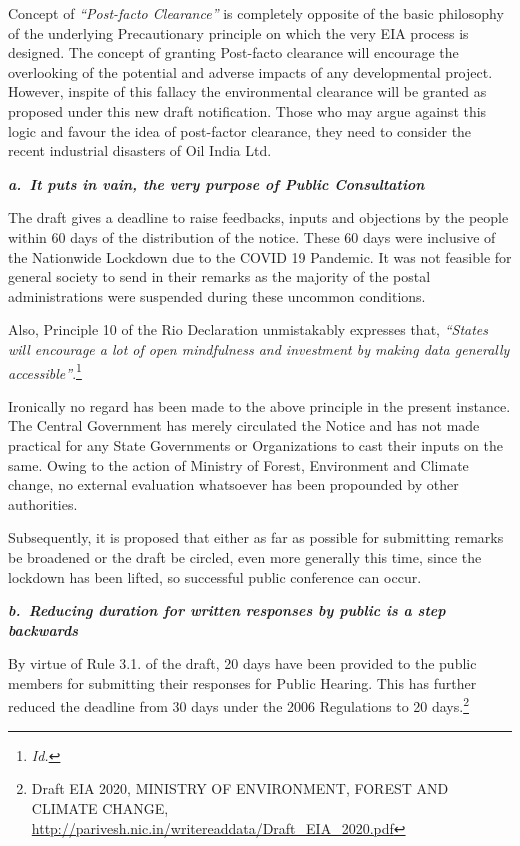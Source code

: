 \begin{multicols}{2}
\noi
Concept of \textit{“Post-facto Clearance”} is completely opposite of the basic philosophy of the
underlying Precautionary principle on which the very EIA process is designed. The concept
of granting Post-facto clearance will encourage the overlooking of the potential and adverse impacts of any developmental project. However, inspite of this fallacy the environmental
clearance will be granted as proposed under this new draft notification. Those who may argue
against this logic and favour the idea of post-factor clearance, they need to consider the recent
industrial disasters of Oil India Ltd.


\vspace{-.15cm}

\noi
{\large\it\bfseries a.~It puts in vain, the very purpose of Public Consultation}

\vspace{-.15cm}

\noi
The draft gives a deadline to raise feedbacks, inputs and objections by the people within 60
days of the distribution of the notice. These 60 days were inclusive of the Nationwide
Lockdown due to the COVID 19 Pandemic. It was not feasible for general society to send in
their remarks as the majority of the postal administrations were suspended during these
uncommon conditions.

\noi
Also, Principle 10 of the Rio Declaration unmistakably expresses that, \textit{“States will encourage
a lot of open mindfulness and investment by making data generally accessible”}.\footnote{\textit{Id.}}

\noi
Ironically no regard has been made to the above principle in the present instance. The Central
Government has merely circulated the Notice and has not made practical for any State
Governments or Organizations to cast their inputs on the same. Owing to the action of
Ministry of Forest, Environment and Climate change, no external evaluation whatsoever has
been propounded by other authorities.

\noi
Subsequently, it is proposed that either as far as possible for submitting remarks be
broadened or the draft be circled, even more generally this time, since the lockdown has been
lifted, so successful public conference can occur.  

\noi
{\large\it\bfseries b.~Reducing duration for written responses by public is a step backwards}

\noi
By virtue of Rule 3.1. of the draft, 20 days have been provided to the public members for
submitting their responses for Public Hearing. This has further reduced the deadline from 30
days under the 2006 Regulations to 20 days.\footnote{Draft EIA 2020, MINISTRY OF ENVIRONMENT, FOREST AND CLIMATE CHANGE,
\url{http://parivesh.nic.in/writereaddata/Draft_EIA_2020.pdf}}


\end{multicols}
